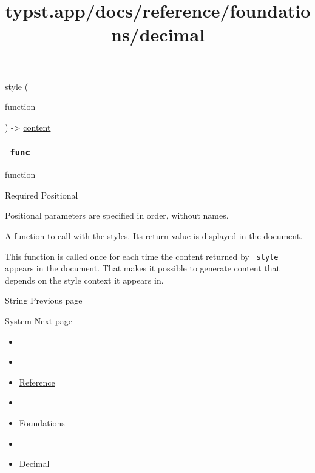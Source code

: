 { style } (

{ \href{/docs/reference/foundations/function/}{function} }

) -\textgreater{} \href{/docs/reference/foundations/content/}{content}

\subsubsection{\texorpdfstring{\texttt{\ func\ }}{ func }}\label{parameters-func}

\href{/docs/reference/foundations/function/}{function}

{Required} {{ Positional }}

\label{parameters-func-positional-tooltip}
Positional parameters are specified in order, without names.

A function to call with the styles. Its return value is displayed in the
document.

This function is called once for each time the content returned by
\texttt{\ style\ } appears in the document. That makes it possible to
generate content that depends on the style context it appears in.

\href{/docs/reference/foundations/str/}{\pandocbounded{}}

{ String } { Previous page }

\href{/docs/reference/foundations/sys/}{\pandocbounded{}}

{ System } { Next page }


\title{typst.app/docs/reference/foundations/decimal}

\begin{itemize}
\tightlist
\item
  \href{/docs}{}
\item
  
\item
  \href{/docs/reference/}{Reference}
\item
  
\item
  \href{/docs/reference/foundations/}{Foundations}
\item
  
\item
  \href{/docs/reference/foundations/decimal/}{Decimal}
\end{itemize}

